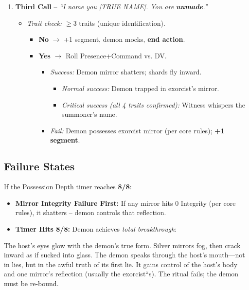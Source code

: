 \begin{enumerate}[leftmargin=*]
\begin{itemize}
  \end{itemize}
\item \textbf{Third Call} -- \textit{``I name you [TRUE NAME]. You are \textbf{unmade}.''}
  \begin{itemize}
    \item \textit{Trait check:} $\ge$3 traits (unique identification).
      \begin{itemize}
        \item \textbf{No} $\rightarrow$ +1 segment, demon mocks, \textbf{end action}.
        \item \textbf{Yes} $\rightarrow$ Roll Presence+Command vs. DV.
          \begin{itemize}
            \item \textit{Success:} Demon mirror shatters; shards fly inward.  
              \begin{itemize}
                \item \textit{Normal success:} Demon trapped in exorcist's mirror.  
                \item \textit{Critical success (all 4 traits confirmed):} Witness whispers the summoner's name.
              \end{itemize}
            \item \textit{Fail:} Demon possesses exorcist mirror (per core rules); \textbf{+1 segment}.
          \end{itemize}
      \end{itemize}
  \end{itemize}
\end{enumerate}

\subsection*{Failure States}
If the Possession Depth timer reaches \textbf{8/8}:
\begin{itemize}
  \item \textbf{Mirror Integrity Failure First:} If any mirror hits 0 Integrity (per core rules), it shatters -- demon controls that reflection.
  \item \textbf{Timer Hits 8/8:} Demon achieves \textit{total breakthrough}:
\end{itemize}

\begin{tcolorbox}[colback=black!3,colframe=red!60!black,title={Total Breakthrough},breakable]
The host's eyes glow with the demon's true form. Silver mirrors fog, then crack inward as if sucked into glass. The demon speaks through the host's mouth---not in lies, but in the awful truth of its first lie. It gains control of the host's body and one mirror's reflection (usually the exorcist``s). The ritual fails; the demon must be re-bound.
\end{tcolorbox}

